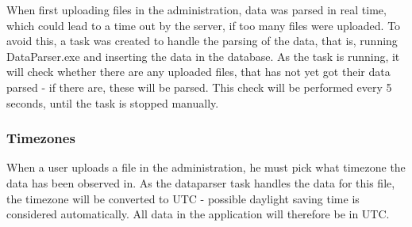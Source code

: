 When first uploading files in the administration, data was parsed in real time, which could lead to a time out by the server, if too many files were uploaded. To avoid this, a task was created to handle the parsing of the data, that is, running DataParser.exe and inserting the data in the database. As the task is running, it will check whether there are any uploaded files, that has not yet got their data parsed - if there are, these will be parsed. This check will be performed every 5 seconds, until the task is stopped manually.

\subsubsection{Timezones}
When a user uploads a file in the administration, he must pick what timezone the data has been observed in. As the dataparser task handles the data for this file, the timezone will be converted to UTC - possible daylight saving time is considered automatically. All data in the application will therefore be in UTC.